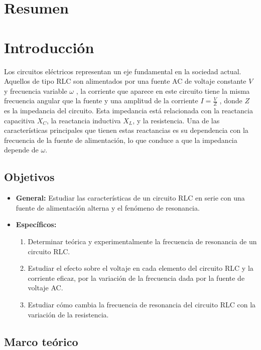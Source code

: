\documentclass[spanish,notitlepage,letterpaper, 12pt]{article}
\begin{document}

\tableofcontents

\newpage

\section{Resumen}
\lipsum[1]
\section{Introducción}
Los circuitos eléctricos representan un eje fundamental en la sociedad actual. Aquellos de tipo RLC son alimentados por una
fuente AC de voltaje constante $V$ y frecuencia variable $\omega$ , la corriente que
aparece en este circuito tiene la misma frecuencia angular que la fuente y una
amplitud de la corriente $I = \frac{V}{Z}$ , donde $Z$ es la impedancia del circuito. Esta
impedancia está relacionada con la reactancia capacitiva $X_C$, la reactancia
inductiva $X_L$, y la resistencia. Una de las características principales que tienen
estas reactancias es su dependencia con la frecuencia de la fuente de
alimentación, lo que conduce a que la impedancia depende de $\omega$.\par
\subsection{Objetivos}
\begin{itemize}
    \item \textbf{General: }Estudiar las características de un circuito RLC en serie con una fuente de
alimentación alterna y el fenómeno de resonancia.
\item \textbf{Específicos: }
    \begin{enumerate}
        \item Determinar teórica y experimentalmente la frecuencia de resonancia de un circuito RLC.
        \item Estudiar el efecto sobre el voltaje en cada elemento del circuito RLC y la
corriente eficaz, por la variación de la frecuencia dada por la fuente de
voltaje AC.
        \item Estudiar cómo cambia la frecuencia de resonancia del circuito RLC con
la variación de la resistencia.
    \end{enumerate}
\end{itemize}
\subsection{Marco teórico} \label{I.MT}
\end{document}
